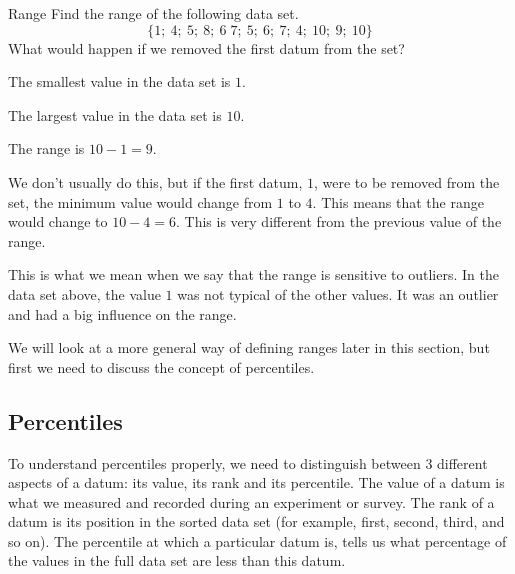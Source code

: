 \begin{wex}{Range}{
    Find the range of the following data set.
    \begin{equation}
      \{1;\ 4;\ 5;\ 8;\ 6\; 7;\ 5;\ 6;\ 7;\ 4;\ 10;\ 9;\ 10\}
    \end{equation}
    What would happen if we removed the first datum from the set?
}{

  The smallest value in the data set is $1$.


  The largest value in the data set is $10$.


  The range is $10-1=9$.


  We don't usually do this, but if the first datum, $1$, were to be
  removed from the set, the minimum value would change from $1$ to
  $4$. This means that the range would change to $10-4=6$. This is
  very different from the previous value of the range.

  This is what we mean when we say that the range is sensitive to
  outliers. In the data set above, the value $1$ was not typical of
  the other values. It was an outlier and had a big influence on the
  range.

}
\end{wex}

We will look at a more general way of defining ranges later in this
section, but first we need to discuss the concept of percentiles.

\subsection{Percentiles}


To understand percentiles properly, we need to distinguish between $3$
different aspects of a datum: its value, its rank and its
percentile. The value of a datum is what we measured and recorded
during an experiment or survey. The rank of a datum is its position in
the sorted data set (for example, first, second, third, and so
on). The percentile at which a particular datum is, tells us what
percentage of the values in the full data set are less than this
datum.

